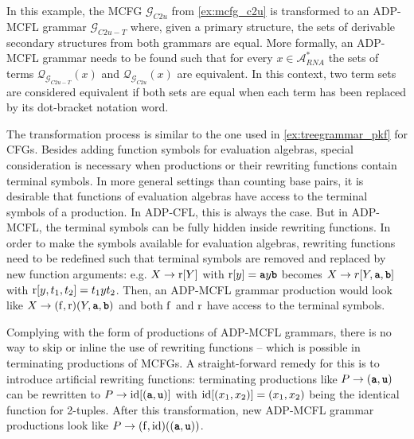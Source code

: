 \documentclass[
    a4paper,
    12pt,
    twoside,
    BCOR=12mm,
    parskip=half,
    chapterprefix,
    numbers=noenddot,
    bibliography=totoc
]{scrbook}
\begin{document}
\begin{example}
	\label{ex:treegrammar_c2u}
	In this example, the \gls{MCFG} $\mathcal{G}_{C2u}$ from \cref{ex:mcfg_c2u} is transformed to an ADP-MCFL grammar $\mathcal{G}_{C2u-T}$ where, given a primary structure, the sets of derivable secondary structures from both grammars are equal. More formally, an ADP-MCFL grammar needs to be found such that for every $x \in \mathcal{A}^*_{RNA}$ the sets of terms $\mathcal{Q}_{\mathcal{G}_{C2u-T}}(x)$ and $\mathcal{Q}_{\mathcal{G}_{C2u}}(x)$ are equivalent. In this context, two term sets are considered equivalent if both sets are equal when each term has been replaced by its dot-bracket notation word.
	
	The transformation process is similar to the one used in \cref{ex:treegrammar_pkf} for \glspl{CFG}. Besides adding function symbols for evaluation algebras, special consideration is necessary when productions or their rewriting functions contain terminal symbols. In more general settings than counting base pairs, it is desirable that functions of evaluation algebras have access to the terminal symbols of a production. In ADP-CFL, this is always the case. But in ADP-MCFL, the terminal symbols can be fully hidden inside rewriting functions. In order to make the symbols available for evaluation algebras, rewriting functions need to be redefined such that terminal symbols are removed and replaced by new function arguments: e.g. $X \to \mathrm{r}[Y]$ with $\op{r}[y]=\ts{a}y\ts{b}$ becomes $X \to r[Y,\ts{a},\ts{b}]$ with $\mathrm{r}[y,t_1,t_2]=t_1 y t_2$. Then, an ADP-MCFL grammar production would look like $X \to (\op{f},\op{r})(Y,\ts{a},\ts{b})$ and both $\mathrm{f}$ and $\mathrm{r}$ have access to the terminal symbols.
	
	Complying with the form of productions of ADP-MCFL grammars, there is no way to skip or inline the use of rewriting functions -- which is possible in terminating productions of \glspl{MCFG}. A straight-forward remedy for this is to introduce artificial rewriting functions: terminating productions like $P \to (\ts{a},\ts{u})$ can be rewritten to $P \to \op{id}[(\ts{a},\ts{u})]$ with $\mathrm{id}[(x_1,x_2)] = (x_1,x_2)$ being the identical function for 2-tuples. After this transformation, new ADP-MCFL grammar productions look like $P \to (\op{f},\op{id})((\ts{a},\ts{u}))$.
		

\end{example}
\end{document}
